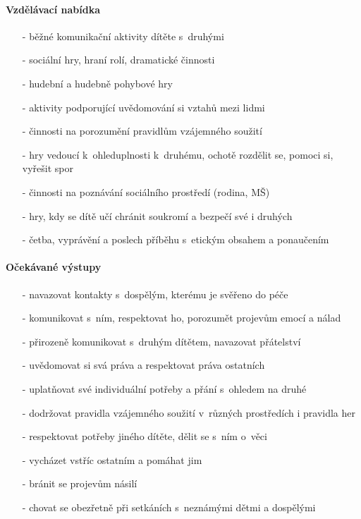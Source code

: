 					\paragraph{Vzdělávací nabídka}

					\begin{itemize}
					\setlength\itemsep{-2mm}
						\item[-]běžné komunikační aktivity dítěte s~druhými
						\item[-]sociální hry, hraní rolí, dramatické činnosti
						\item[-]hudební a hudebně pohybové hry
						\item[-]aktivity podporující uvědomování si vztahů mezi lidmi
						\item[-]činnosti na porozumění pravidlům vzájemného soužití
						\item[-]hry vedoucí k~ohleduplnosti k~druhému, ochotě rozdělit se, pomoci si, vyřešit spor
						\item[-]činnosti na poznávání sociálního prostředí (rodina, MŠ)
						\item[-]hry, kdy se dítě učí chránit soukromí a bezpečí své i druhých
						\item[-]četba, vyprávění a poslech příběhu s~etickým obsahem a ponaučením
					\end{itemize}
					
					\paragraph{Očekávané výstupy}

					\begin{itemize}
					\setlength\itemsep{-2mm}
						\item[-]navazovat kontakty s~dospělým, kterému je svěřeno do péče
						\item[-]komunikovat s~ním, respektovat ho, porozumět projevům emocí a nálad
						\item[-]přirozeně komunikovat s~druhým dítětem, navazovat přátelství
						\item[-]uvědomovat si svá práva a respektovat práva ostatních
						\item[-]uplatňovat své individuální potřeby a přání s~ohledem na druhé
						\item[-]dodržovat pravidla vzájemného soužití v~různých prostředích i pravidla her
						\item[-]respektovat potřeby jiného dítěte, dělit se s~ním o~věci
						\item[-]vycházet vstříc ostatním a pomáhat jim
						\item[-]bránit se projevům násilí
						\item[-]chovat se obezřetně při setkáních s~neznámými dětmi a dospělými
					\end{itemize}

